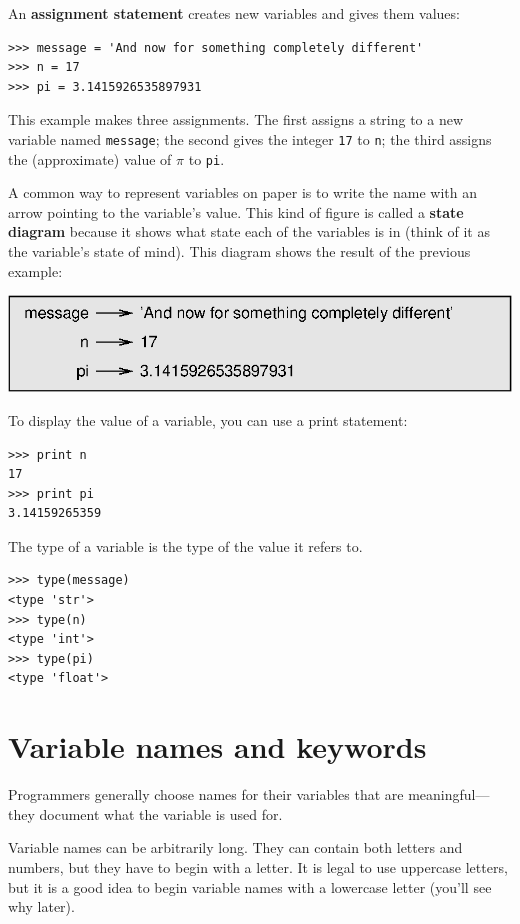 \documentclass[10pt]{book}
\begin{document}
An {\bf assignment statement} creates new variables and gives
them values:

\beforeverb
\begin{verbatim}
>>> message = 'And now for something completely different'
>>> n = 17
>>> pi = 3.1415926535897931
\end{verbatim}
\afterverb
%
This example makes three assignments.  The first assigns a string
to a new variable named {\tt message};
the second gives the integer {\tt 17} to {\tt n}; the third
assigns the (approximate) value of $\pi$ to {\tt pi}.


A common way to represent variables on paper is to write the name with
an arrow pointing to the variable's value.  This kind of figure is
called a {\bf state diagram} because it shows what state each of the
variables is in (think of it as the variable's state of mind).
This diagram shows the result of the previous example:

\beforefig
\centerline{\includegraphics{figs/state2.eps}}
\afterfig

To display the value of a variable, you can use a print statement:

\beforeverb
\begin{verbatim}
>>> print n
17
>>> print pi
3.14159265359
\end{verbatim}
\afterverb
%
The type of a variable is the type of the value it refers to.

\beforeverb
\begin{verbatim}
>>> type(message)
<type 'str'>
>>> type(n)
<type 'int'>
>>> type(pi)
<type 'float'>
\end{verbatim}
\afterverb
%

\section{Variable names and keywords}

Programmers generally choose names for their variables that
are meaningful---they document what the variable is used for.

Variable names can be arbitrarily long.  They can contain
both letters and numbers, but they have to begin with a letter.
It is legal to use uppercase letters, but it is a good idea
to begin variable names with a lowercase letter (you'll
see why later).
\end{document}
